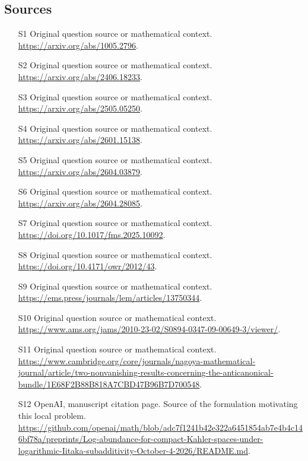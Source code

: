 \documentclass[11pt]{article}
\begin{document}
\subsection{Sources}
\begin{itemize}
\item[S1] Original question source or mathematical context.
\url{https://arxiv.org/abs/1005.2796}.
\item[S2] Original question source or mathematical context.
\url{https://arxiv.org/abs/2406.18233}.
\item[S3] Original question source or mathematical context.
\url{https://arxiv.org/abs/2505.05250}.
\item[S4] Original question source or mathematical context.
\url{https://arxiv.org/abs/2601.15138}.
\item[S5] Original question source or mathematical context.
\url{https://arxiv.org/abs/2604.03879}.
\item[S6] Original question source or mathematical context.
\url{https://arxiv.org/abs/2604.28085}.
\item[S7] Original question source or mathematical context.
\url{https://doi.org/10.1017/fms.2025.10092}.
\item[S8] Original question source or mathematical context.
\url{https://doi.org/10.4171/owr/2012/43}.
\item[S9] Original question source or mathematical context.
\url{https://ems.press/journals/lem/articles/13750344}.
\item[S10] Original question source or mathematical context.
\url{https://www.ams.org/jams/2010-23-02/S0894-0347-09-00649-3/viewer/}.
\item[S11] Original question source or mathematical context.
\url{https://www.cambridge.org/core/journals/nagoya-mathematical-journal/article/two-nonvanishing-results-concerning-the-anticanonical-bundle/1E68F2B88B818A7CBD47B96B7D700548}.
\item[S12] OpenAI, manuscript citation page. Source of the formulation motivating this local problem.
\url{https://github.com/openai/math/blob/adc7f1241b42e322a6451854ab7e4b4c146bf78a/preprints/Log-abundance-for-compact-Kahler-spaces-under-logarithmic-Iitaka-subadditivity-October-4-2026/README.md}.
\end{itemize}
\end{document}
